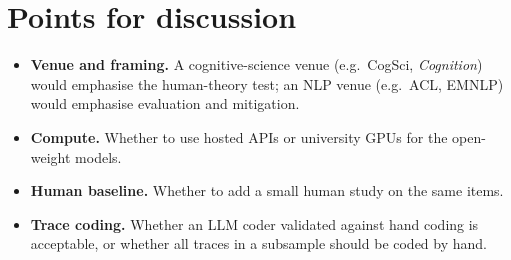 \documentclass[11pt,a4paper]{article}
\begin{document}
\section{Points for discussion}

\begin{itemize}
  \item \textbf{Venue and framing.} A cognitive-science venue (e.g.\ CogSci, \emph{Cognition}) would emphasise the human-theory test; an NLP venue (e.g.\ ACL, EMNLP) would emphasise evaluation and mitigation.
  \item \textbf{Compute.} Whether to use hosted APIs or university GPUs for the open-weight models.
  \item \textbf{Human baseline.} Whether to add a small human study on the same items.
  \item \textbf{Trace coding.} Whether an LLM coder validated against hand coding is acceptable, or whether all traces in a subsample should be coded by hand.
\end{itemize}



\end{document}
